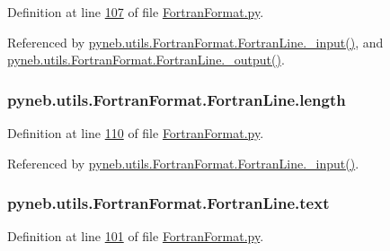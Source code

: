 Definition at line \hyperlink{_fortran_format_8py_source_l00107}{107} of file \hyperlink{_fortran_format_8py_source}{Fortran\-Format.\-py}.



Referenced by \hyperlink{_fortran_format_8py_source_l00155}{pyneb.\-utils.\-Fortran\-Format.\-Fortran\-Line.\-\_\-input()}, and \hyperlink{_fortran_format_8py_source_l00195}{pyneb.\-utils.\-Fortran\-Format.\-Fortran\-Line.\-\_\-output()}.

\hypertarget{classpyneb_1_1utils_1_1_fortran_format_1_1_fortran_line_a4cd0f5ee28f8250f2c6fbbb9ff890e0a}{
\subsubsection[{length}]{\setlength{\rightskip}{0pt plus 5cm}pyneb.\-utils.\-Fortran\-Format.\-Fortran\-Line.\-length}}\label{classpyneb_1_1utils_1_1_fortran_format_1_1_fortran_line_a4cd0f5ee28f8250f2c6fbbb9ff890e0a}


Definition at line \hyperlink{_fortran_format_8py_source_l00110}{110} of file \hyperlink{_fortran_format_8py_source}{Fortran\-Format.\-py}.



Referenced by \hyperlink{_fortran_format_8py_source_l00155}{pyneb.\-utils.\-Fortran\-Format.\-Fortran\-Line.\-\_\-input()}.

\hypertarget{classpyneb_1_1utils_1_1_fortran_format_1_1_fortran_line_a70d4893b8dd8ae61297b1d3e4b8bc612}{
\subsubsection[{text}]{\setlength{\rightskip}{0pt plus 5cm}pyneb.\-utils.\-Fortran\-Format.\-Fortran\-Line.\-text}}\label{classpyneb_1_1utils_1_1_fortran_format_1_1_fortran_line_a70d4893b8dd8ae61297b1d3e4b8bc612}


Definition at line \hyperlink{_fortran_format_8py_source_l00101}{101} of file \hyperlink{_fortran_format_8py_source}{Fortran\-Format.\-py}.



